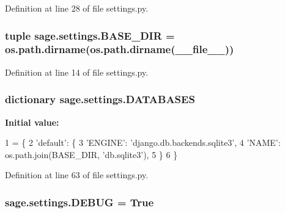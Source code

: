 Definition at line 28 of file settings.\+py.

\hypertarget{namespacesage_1_1settings_add6d83672b1137d74a06bf1606aecf04}{}
\subsubsection[{B\+A\+S\+E\+\_\+\+D\+I\+R}]{\setlength{\rightskip}{0pt plus 5cm}tuple sage.\+settings.\+B\+A\+S\+E\+\_\+\+D\+I\+R = os.\+path.\+dirname(os.\+path.\+dirname(\+\_\+\+\_\+file\+\_\+\+\_\+))}\label{namespacesage_1_1settings_add6d83672b1137d74a06bf1606aecf04}


Definition at line 14 of file settings.\+py.

\hypertarget{namespacesage_1_1settings_a870c10acdd1141ac92340ce3e50ffbbd}{}
\subsubsection[{D\+A\+T\+A\+B\+A\+S\+E\+S}]{\setlength{\rightskip}{0pt plus 5cm}dictionary sage.\+settings.\+D\+A\+T\+A\+B\+A\+S\+E\+S}\label{namespacesage_1_1settings_a870c10acdd1141ac92340ce3e50ffbbd}
{\bfseries Initial value\+:}
\begin{DoxyCode}
1 = \{
2     \textcolor{stringliteral}{'default'}: \{
3         \textcolor{stringliteral}{'ENGINE'}: \textcolor{stringliteral}{'django.db.backends.sqlite3'},
4         \textcolor{stringliteral}{'NAME'}: os.path.join(BASE\_DIR, \textcolor{stringliteral}{'db.sqlite3'}),
5     \}
6 \}
\end{DoxyCode}


Definition at line 63 of file settings.\+py.

\hypertarget{namespacesage_1_1settings_acc28086c56df6aed910b2552e07944cc}{}
\subsubsection[{D\+E\+B\+U\+G}]{\setlength{\rightskip}{0pt plus 5cm}sage.\+settings.\+D\+E\+B\+U\+G = True}\label{namespacesage_1_1settings_acc28086c56df6aed910b2552e07944cc}


